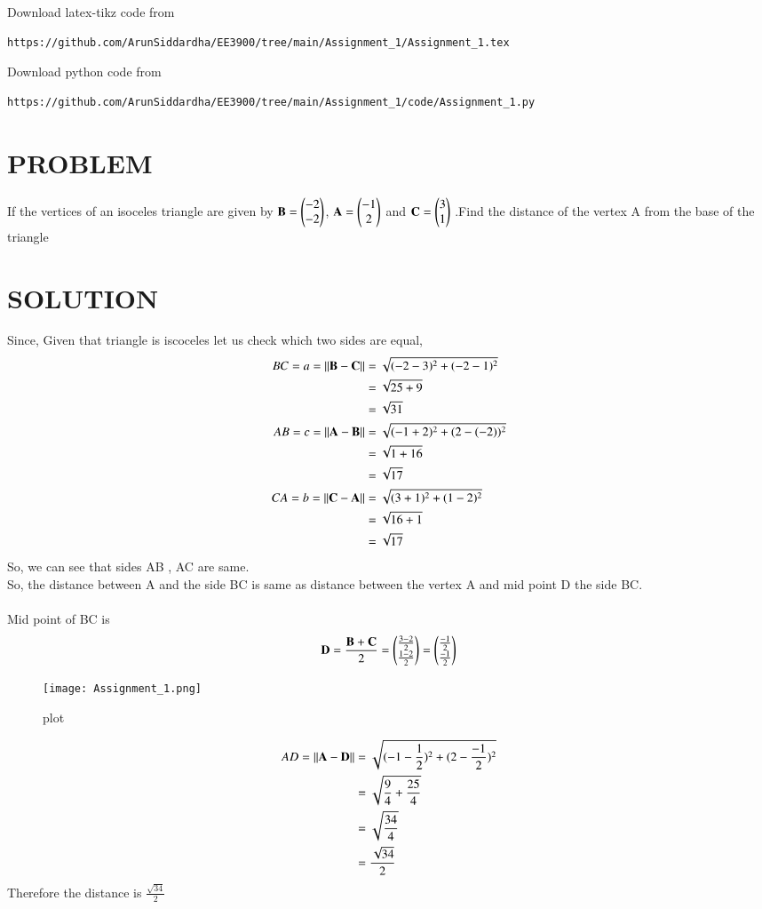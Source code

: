 \documentclass[journal,12pt,twocolumn]{IEEEtran}
\begin{document}
%
Download latex-tikz code from 
%
\begin{lstlisting}
https://github.com/ArunSiddardha/EE3900/tree/main/Assignment_1/Assignment_1.tex
\end{lstlisting}
%
Download python code from 
%
\begin{lstlisting}
https://github.com/ArunSiddardha/EE3900/tree/main/Assignment_1/code/Assignment_1.py
\end{lstlisting}
\section{PROBLEM}
If the vertices of an isoceles triangle are given by  $\mathbf{B} = \begin{pmatrix}-2\\-2\end{pmatrix}$, $\mathbf{A}=\begin{pmatrix}-1\\2\end{pmatrix}$ and $\mathbf{C}=\begin{pmatrix}3\\1\end{pmatrix}$ .Find the distance of the vertex A from the base of the triangle 
\section*{SOLUTION}
Since, Given that triangle is iscoceles let us check which two sides are equal,
\begin{align*}
    BC = a = \lVert\mathbf{B} - \mathbf{C}\rVert &= \sqrt{(-2-3)^{2}+ (-2-1)^{2}}\\
    &= \sqrt{25 + 9}\\
    &= \sqrt{31}\\
    AB = c = \lVert\mathbf{A} - \mathbf{B}\rVert &= \sqrt{(-1+2)^{2}+ (2-(-2))^{2}}\\
    &= \sqrt{1 + 16}\\
    &= \sqrt{17}\\
    CA = b = \lVert\mathbf{C} - \mathbf{A}\rVert &= \sqrt{(3+1)^{2}+ (1-2)^{2}}\\
    &= \sqrt{16 + 1}\\
    &= \sqrt{17}
\end{align*}
So, we can see that sides AB , AC are same.\\
So, the distance between A and the side BC is same as distance between the vertex A and mid point D the side BC.\\\\
Mid point of BC is
\begin{align*}
     \mathbf{D}= \frac{\mathbf{B} + \mathbf{C}}{2} = \begin{pmatrix}\frac{3-2}{2}\\\frac{1-2}{2}\end{pmatrix}=\begin{pmatrix}\frac{-1}{2}\\ \frac{-1}{2}\end{pmatrix}
\end{align*}
\begin{figure}[htp]
    \centering
    \texttt{[image: Assignment\_1.png]}
    \caption{plot}
    \label{fig:my_label}
\end{figure}
\begin{align*}
    AD = \lVert\mathbf{A} - \mathbf{D}\rVert &= \sqrt{(-1-\frac{1}{2})^{2} + (2-\frac{-1}{2})^{2}}\\
    &= \sqrt{\frac{9}{4} + \frac{25}{4}}\\
    &= \sqrt{\frac{34}{4}}\\
    &= \frac{\sqrt{34}}{2}
\end{align*}
Therefore the distance is $\frac{\sqrt{34}}{2}$
\end{document}
